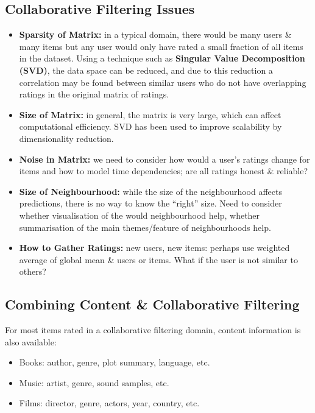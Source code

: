 \documentclass[a4paper,11pt]{article}
\begin{document}
\subsection{Collaborative Filtering Issues}
\begin{itemize}
    \item   \textbf{Sparsity of Matrix:} in a typical domain, there would be many users \& many items but any user would only have rated a small fraction of all items in the dataset.
            Using a technique such as \textbf{Singular Value Decomposition (SVD)}, the data space can be reduced, and due to this reduction a correlation may be found between similar users who do not have overlapping ratings in the original matrix of ratings.

    \item   \textbf{Size of Matrix:} in general, the matrix is very large, which can affect computational efficiency.
            SVD has been used to improve scalability by dimensionality reduction.

    \item   \textbf{Noise in Matrix:} we need to consider how would a user's ratings change for items and how to model time dependencies; are all ratings honest \& reliable?

    \item   \textbf{Size of Neighbourhood:} while the size of the neighbourhood affects predictions, there is no way to know the ``right'' size.
             Need to consider whether visualisation of the would neighbourhood help, whether summarisation of the main themes/feature of neighbourhoods help.

    \item   \textbf{How to Gather Ratings:} new users, new items: perhaps use weighted average of global mean \& users or items.
            What if the user is not similar to others?
\end{itemize}

\subsection{Combining Content \& Collaborative Filtering}
For most items rated in a collaborative filtering domain, content information is also available:
\begin{itemize}
    \item   Books: author, genre, plot summary, language, etc.
    \item   Music: artist, genre, sound samples, etc.
    \item   Films: director, genre, actors, year, country, etc.
\end{itemize}
\end{document}
